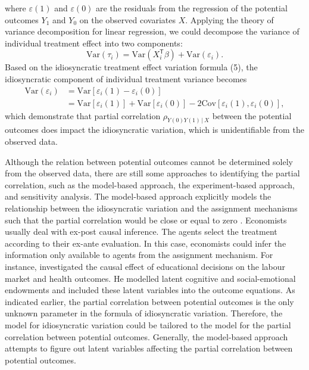 	where $\varepsilon(1)$ and $\varepsilon(0)$ are the residuals from the regression of the potential outcomes $Y_{1}$ and $Y_{0}$ on the observed covariates $X$. Applying the theory of variance decomposition for linear regression, we could decompose the variance of individual treatment effect into two components:
	\begin{equation}
		\text{Var}(\tau_{i}) = \text{Var}(X_{i}^{\mathsf{T}}\beta) + \text{Var}(\varepsilon_{i}). 
	\end{equation}
	Based on the idiosyncratic treatment effect variation formula (5), the idiosyncratic component of individual treatment variance becomes
	\begin{equation}
		\begin{array}{cl}
			\text{Var}(\varepsilon_{i}) &= \text{Var}[\varepsilon_{i}(1) -\varepsilon_{i}(0)]\\ 
			&= \text{Var}[\varepsilon_{i}(1)] + \text{Var}[\varepsilon_{i}(0)] - 2\text{Cov}[\varepsilon_{i}(1), \varepsilon_{i}(0)], 
		\end{array}
	\end{equation} 
	which demonstrate that partial correlation $\rho_{Y(0)Y(1)\,|\ X}$ between the potential outcomes does impact the idiosyncratic variation, which is unidentifiable from the observed data. 
	
	Although the relation between potential outcomes cannot be determined solely from the observed data, there are still some approaches to identifying the partial correlation, such as the model-based approach, the experiment-based approach, and sensitivity analysis. The model-based approach explicitly models the relationship between the idiosyncratic variation and the assignment mechanisms such that the partial correlation would be close or equal to zero \citep{heckman2005scientific}. Economists usually deal with ex-post causal inference. The agents select the treatment according to their ex-ante evaluation. In this case, economists could infer the information only available to agents from the assignment mechanism.  For instance, \citet{heckman2010effects} investigated the causal effect of educational decisions on the labour market and health outcomes. He modelled latent cognitive and social-emotional endowments and included these latent variables into the outcome equations. As indicated earlier, the partial correlation between potential outcomes is the only unknown parameter in the formula of idiosyncratic variation. Therefore, the model for idiosyncratic variation could be tailored to the model for the partial correlation between potential outcomes. Generally, the model-based approach attempts to figure out latent variables affecting the partial correlation between potential outcomes. 
	
